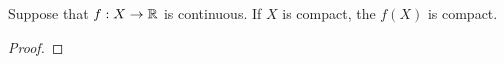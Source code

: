 \documentclass[../main.tex]{subfiles}
\begin{document}
\begin{theorem}\label{trm:10.19}
    Suppose that $f:X\to\mathbb{R}$ is continuous. If $X$ is compact, the $f(X)$ is compact.
    \begin{proof}






\end{proof}
\end{theorem}
\end{document}
